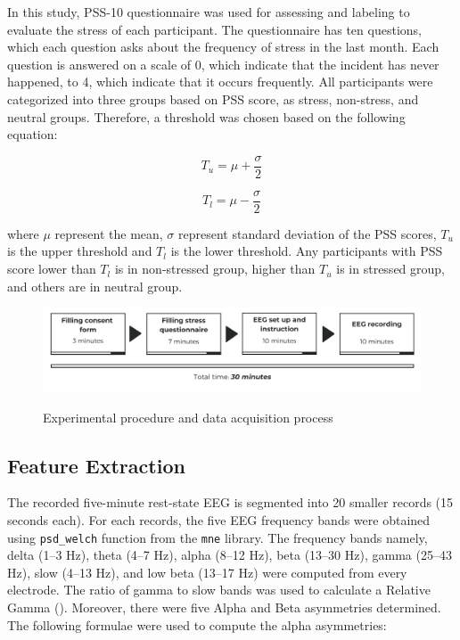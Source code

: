 \documentclass[pdflatex,sn-mathphys]{sn-jnl}%
\theoremstyle{thmstyleone}%
\theoremstyle{thmstyletwo}%
\theoremstyle{thmstylethree}%
\begin{document}
In this study, PSS-10 questionnaire was used for assessing and labeling to evaluate the stress of each participant. The questionnaire has ten questions, which each question asks about the frequency of stress in the last month. Each question is answered on a scale of 0, which indicate that the incident has never happened, to 4, which indicate that it occurs frequently. All participants were categorized into three groups based on PSS score, as stress, non-stress, and neutral groups. Therefore, a threshold was chosen based on the following equation:

\begin{equation} \label{eq:1}
   T_{u} =\mu + \frac{\sigma}{2}
\end{equation}

\begin{equation} \label{eq:2}
   T_{l} =\mu - \frac{\sigma}{2}
\end{equation}

where $\mu$ represent the mean, $\sigma$ represent standard deviation of the PSS scores, $T_{u}$ is the upper threshold and $T_{l}$ is the lower threshold. Any participants with PSS score lower than $T_{l}$ is in non-stressed group, higher than $T_{u}$ is in stressed group, and others are in neutral group.

\begin{figure}[h!]
  \centering
  \caption{Experimental procedure and data acquisition process}
  \includegraphics[width=1\textwidth]{Experimentalprocedure.png}
  \label{fig:procedure}
\end{figure}


\subsection{Feature Extraction}\label{method:featureExtraction}
The recorded five-minute rest-state EEG is segmented into 20 smaller records (15 seconds each). For each records, the five EEG frequency bands were obtained using \texttt{psd\_welch} function from the \texttt{mne} library. The frequency bands namely, delta (1–3 Hz), theta (4–7 Hz), alpha (8–12 Hz), beta (13–30 Hz), gamma (25–43 Hz), slow (4–13 Hz), and low beta (13–17 Hz) were computed from every electrode. The ratio of gamma to slow bands was used to calculate a Relative Gamma (). Moreover, there were five Alpha and Beta asymmetries determined. The following formulae were used to compute the alpha asymmetries:
\end{document}
